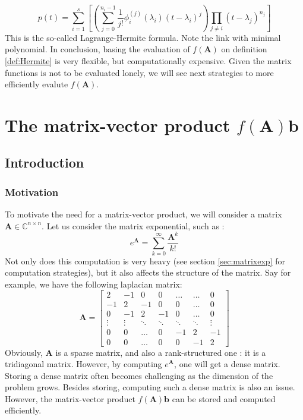 \documentclass[11pt]{article}
\numberwithin{equation}{section}
\begin{document}
\begin{equation}
    p(t) = \sum_{i=1}^s\left[\left(\sum_{j=0}^{n_i-1}\frac{1}{j!}\phi_i^{(j)}(\lambda_i)(t-\lambda_i)^j\right)\prod_{j\neq i}(t-\lambda_j)^{n_j}\right]
\end{equation}
This is the so-called Lagrange-Hermite formula. Note the link with minimal polynomial. In conclusion, basing the evaluation of $f(\mathbf{A})$ on definition \ref{def:Hermite} is very flexible, but computationally expensive. Given the matrix functions is not to be evaluated lonely, we will see next strategies to more efficiently evalute $f(\mathbf{A})$.
\section{The matrix-vector product $f(\mathbf{A})\mathbf{b}$}
\subsection{Introduction}\label{sec:fabintro}
\subsubsection{Motivation}
To motivate the need for a matrix-vector product, we will consider a matrix $\mathbf{A}\in\mathbb{C}^{n\times n}$. Let us consider the matrix exponential, such as :
\begin{equation}
    e^{\mathbf{A}} = \sum_{k=0}^\infty \frac{\mathbf{A}^k}{k!}
\end{equation}
Not only does this computation is very heavy (see section \ref{sec:matrixexp} for computation strategies), but it also affects the structure of the matrix. Say for example, we have the following laplacian matrix: 
\begin{equation*}
    \mathbf{A} = \begin{bmatrix}
        2 & -1 & 0 & 0 & \dots &  \dots & 0 \\
        -1 & 2 & -1 & 0 & 0 & \dots & 0 \\
        0 & -1 & 2 & -1 & 0 & \dots & 0 \\
        \vdots & \vdots & \ddots & \ddots & \ddots & \ddots & \vdots \\
        0 & 0 & \dots & 0 & -1 & 2 & -1 \\
        0 & 0 & \dots & 0 & 0 & -1 & 2
    \end{bmatrix}
\end{equation*}
Obviously, $\mathbf{A}$ is a sparse matrix, and also a rank-structured one : it is a tridiagonal matrix. However, by computing $e^{\mathbf{A}}$, one will get a dense matrix. Storing a dense matrix often becomes challenging as the dimension of the problem grows. Besides storing, computing such a dense matrix is also an issue. However, the matrix-vector product $f(\mathbf{A})\mathbf{b}$ can be stored and computed efficiently.
\end{document}
